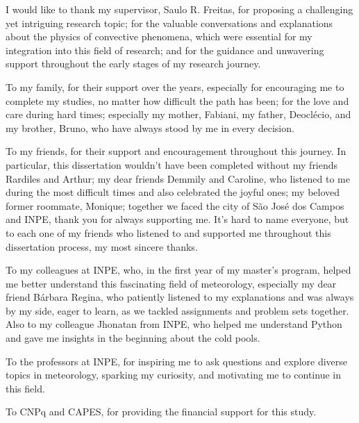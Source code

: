 
\begin{agradecimentos}  %


I would like to thank my supervisor, Saulo R. Freitas, for proposing a challenging yet intriguing research topic; for the valuable conversations and explanations about the physics of convective phenomena, which were essential for my integration into this field of research; and for the guidance and unwavering support throughout the early stages of my research journey.

To my family, for their support over the years, especially for encouraging me to complete my studies, no matter how difficult the path has been; for the love and care during hard times; especially my mother, Fabiani, my father, Deoclécio, and my brother, Bruno, who have always stood by me in every decision.

To my friends, for their support and encouragement throughout this journey. In particular, this dissertation wouldn't have been completed without my friends Rardiles and Arthur; my dear friends Demmily and Caroline, who listened to me during the most difficult times and also celebrated the joyful ones; my beloved former roommate, Monique; together we faced the city of São José dos Campos and INPE, thank you for always supporting me. It's hard to name everyone, but to each one of my friends who listened to and supported me throughout this dissertation process, my most sincere thanks.

To my colleagues at INPE, who, in the first year of my master’s program, helped me better understand this fascinating field of meteorology, especially my dear friend Bárbara Regina, who patiently listened to my explanations and was always by my side, eager to learn, as we tackled assignments and problem sets together. Also to my colleague Jhonatan from INPE, who helped me understand Python and gave me insights in the beginning about the cold pools.

To the professors at INPE, for inspiring me to ask questions and explore diverse topics in meteorology, sparking my curiosity, and motivating me to continue in this field.

To CNPq and CAPES, for providing the financial support for this study.
 

\end{agradecimentos}


